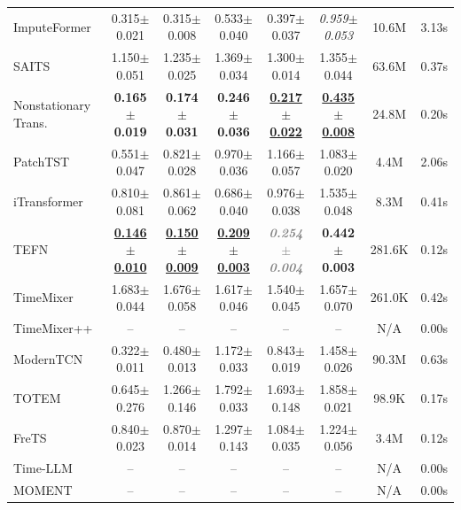 \begin{table}[h]
\begin{footnotesize}
\begin{tabular}{l|ccccc|cc}
        ImputeFormer & 0.315$\pm$0.021 & 0.315$\pm$0.008 & 0.533$\pm$0.040 & 0.397$\pm$0.037 & \textit{0.959$\pm$0.053} & 10.6M & 3.13s \\
        SAITS & 1.150$\pm$0.051 & 1.235$\pm$0.025 & 1.369$\pm$0.034 & 1.300$\pm$0.014 & 1.355$\pm$0.044 & 63.6M & 0.37s \\
        Nonstationary Trans. & \textbf{0.165$\pm$0.019} & \textbf{0.174$\pm$0.031} & \textbf{0.246$\pm$0.036} & \underline{\textbf{0.217$\pm$0.022}} & \underline{\textbf{0.435$\pm$0.008}} & 24.8M & 0.20s \\
        PatchTST & 0.551$\pm$0.047 & 0.821$\pm$0.028 & 0.970$\pm$0.036 & 1.166$\pm$0.057 & 1.083$\pm$0.020 & 4.4M & 2.06s \\
        iTransformer & 0.810$\pm$0.081 & 0.861$\pm$0.062 & 0.686$\pm$0.040 & 0.976$\pm$0.038 & 1.535$\pm$0.048 & 8.3M & 0.41s \\
        TEFN & \underline{\textbf{0.146$\pm$0.010}} & \underline{\textbf{0.150$\pm$0.009}} & \underline{\textbf{0.209$\pm$0.003}} & \textcolor{gray}{\textbf{\textit{0.254$\pm$0.004}}} & \textbf{0.442$\pm$0.003} & 281.6K & 0.12s \\
        TimeMixer & 1.683$\pm$0.044 & 1.676$\pm$0.058 & 1.617$\pm$0.046 & 1.540$\pm$0.045 & 1.657$\pm$0.070 & 261.0K & 0.42s \\
        TimeMixer++ & -- & -- & -- & -- & -- & N/A & 0.00s \\
        ModernTCN & 0.322$\pm$0.011 & 0.480$\pm$0.013 & 1.172$\pm$0.033 & 0.843$\pm$0.019 & 1.458$\pm$0.026 & 90.3M & 0.63s \\
        TOTEM & 0.645$\pm$0.276 & 1.266$\pm$0.146 & 1.792$\pm$0.033 & 1.693$\pm$0.148 & 1.858$\pm$0.021 & 98.9K & 0.17s \\
        FreTS & 0.840$\pm$0.023 & 0.870$\pm$0.014 & 1.297$\pm$0.143 & 1.084$\pm$0.035 & 1.224$\pm$0.056 & 3.4M & 0.12s \\
        Time-LLM & -- & -- & -- & -- & -- & N/A & 0.00s \\
        MOMENT & -- & -- & -- & -- & -- & N/A & 0.00s \\
        \bottomrule
    \end{tabular}
    \end{footnotesize}
\end{table}